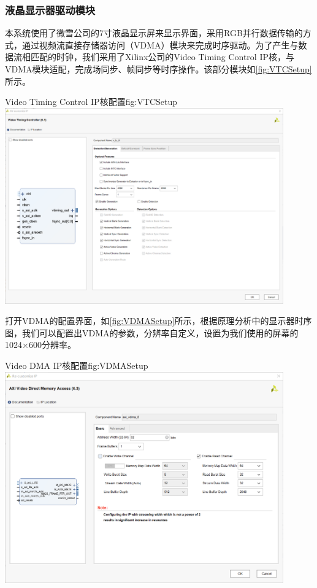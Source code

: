 \documentclass[supercite]{HustGraduPaper}
\begin{document}
	
	\subsubsection{液晶显示器驱动模块}
	
	本系统使用了微雪公司的7寸液晶显示屏来显示界面，采用RGB并行数据传输的方式，通过视频流直接存储器访问（VDMA）模块来完成时序驱动。为了产生与数据流相匹配的时钟，我们采用了Xilinx公司的Video Timing Control IP核，与VDMA模块适配，完成场同步、帧同步等时序操作。该部分模块如\autoref{fig:VTCSetup}所示。
	\begin{generalfig}[htb]{Video Timing Control IP核配置}{fig:VTCSetup}
		\includegraphics[width=12cm]{Figures/VTCSetup.png}
	\end{generalfig}
	
	打开VDMA的配置界面，如\autoref{fig:VDMASetup}所示，根据原理分析中的显示器时序图，我们可以配置出VDMA的参数，分辨率自定义，设置为我们使用的屏幕的1024×600分辨率。	
	\begin{generalfig}[htb]{Video DMA IP核配置}{fig:VDMASetup}
		\includegraphics[width=12cm]{Figures/VDMASetup.png}
	\end{generalfig}
\end{document}
